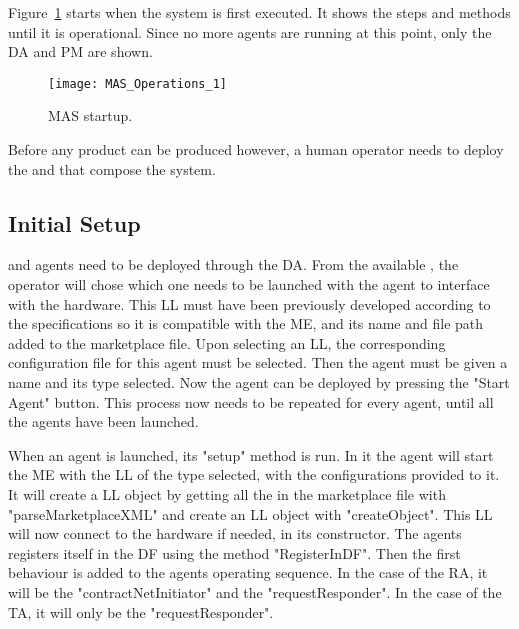Figure~\ref{fig:mas_operations_1} starts when the system is first executed. It shows the steps and methods until it is operational. Since no more agents are running at this point, only the \acrshort{DA} and \acrshort{PM} are shown.

\begin{figure}[h!]
	\centering
	\texttt{[image: MAS\_Operations\_1]}
	\caption{\acrlong{MAS} startup.}
	\label{fig:mas_operations_1}
\end{figure}

Before any product can be produced however, a human operator needs to deploy the  and  that compose the system.\\

\subsection{Initial Setup}
\label{subsec:initial_setup}

 and  agents need to be deployed through the \acrshort{DA}. From the available , the operator will chose which one needs to be launched with the agent to interface with the hardware. This \acrshort{LL} must have been previously developed according to the specifications so it is compatible with the \acrlong{ME}, and its name and file path added to the marketplace file. Upon selecting an \acrshort{LL}, the corresponding configuration file for this agent must be selected. Then the agent must be given a name and its type selected. Now the agent can be deployed by pressing the "Start Agent" button. This process now needs to be repeated for every agent, until all the agents have been launched.

When an agent is launched, its "setup" method is run. In it the agent will start the \acrshort{ME} with the \acrshort{LL} of the type selected, with the configurations provided to it. It will create a \acrlong{LL} object by getting all the  in the marketplace file with "parseMarketplaceXML" and create an \acrshort{LL} object with "createObject". This \acrshort{LL} will now connect to the hardware if needed, in its constructor. The agents registers itself in the \acrshort{DF} using the method "RegisterInDF". Then the first behaviour is added to the agents operating sequence. In the case of the \acrshort{RA}, it will be the "contractNetInitiator" and the "requestResponder". In the case of the \acrshort{TA}, it will only be the "requestResponder".

